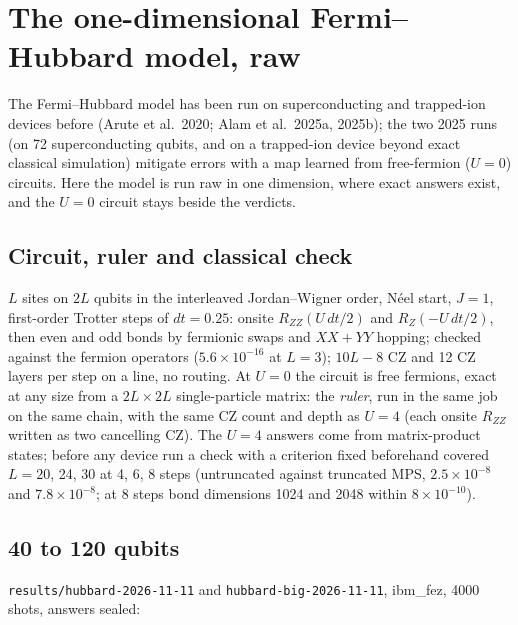\documentclass[10pt,a4paper]{article}
\begin{document}
\section{The one-dimensional Fermi--Hubbard model, raw}\label{sec:hubbard}
The Fermi--Hubbard model has been run on superconducting and trapped-ion devices before (Arute et al.\ 2020; Alam et
al.\ 2025a, 2025b); the two 2025 runs (on 72 superconducting qubits, and on a trapped-ion device beyond exact classical
simulation) mitigate errors with a map learned from free-fermion ($U = 0$) circuits. Here the model is run raw in one dimension, where exact answers
exist, and the $U = 0$ circuit stays beside the verdicts.
\subsection{Circuit, ruler and classical check}
$L$ sites on $2L$ qubits in the interleaved Jordan--Wigner order, N\'eel start, $J = 1$, first-order Trotter steps of
$dt = 0.25$: onsite $R_{ZZ}(U\,dt/2)$ and $R_Z(-U\,dt/2)$, then even and odd bonds by fermionic swaps and $XX+YY$
hopping; checked against the fermion operators ($5.6\times10^{-16}$ at $L = 3$); $10L-8$ CZ and 12 CZ layers per step
on a line, no routing. At $U = 0$ the circuit is free fermions, exact at any size from a $2L\times2L$ single-particle
matrix: the \emph{ruler}, run in the same job on the same chain, with the same CZ count and depth as $U = 4$ (each
onsite $R_{ZZ}$ written as two cancelling CZ). The $U = 4$ answers come from matrix-product states; before any device
run a check with a criterion fixed beforehand covered $L = 20$, 24, 30 at 4, 6, 8 steps (untruncated against truncated
MPS, $2.5\times10^{-8}$ and $7.8\times10^{-8}$; at 8 steps bond dimensions 1024 and 2048 within $8\times10^{-10}$).

\subsection{40 to 120 qubits}
\texttt{results/hubbard-2026-11-11} and \texttt{hubbard-big-2026-11-11}, ibm\_fez, 4000 shots, answers sealed:
\end{document}
